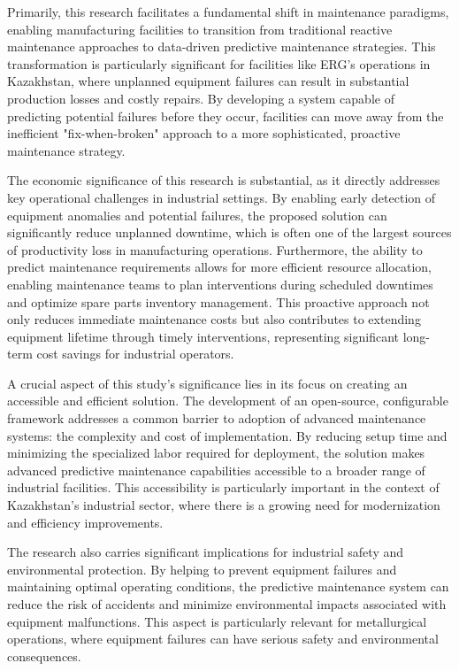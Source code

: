 Primarily, this research facilitates a fundamental shift in maintenance paradigms, enabling manufacturing facilities to transition from traditional reactive maintenance approaches to data-driven predictive maintenance strategies. This transformation is particularly significant for facilities like ERG's operations in Kazakhstan, where unplanned equipment failures can result in substantial production losses and costly repairs. By developing a system capable of predicting potential failures before they occur, facilities can move away from the inefficient "fix-when-broken" approach to a more sophisticated, proactive maintenance strategy.

The economic significance of this research is substantial, as it directly addresses key operational challenges in industrial settings. By enabling early detection of equipment anomalies and potential failures, the proposed solution can significantly reduce unplanned downtime, which is often one of the largest sources of productivity loss in manufacturing operations. Furthermore, the ability to predict maintenance requirements allows for more efficient resource allocation, enabling maintenance teams to plan interventions during scheduled downtimes and optimize spare parts inventory management. This proactive approach not only reduces immediate maintenance costs but also contributes to extending equipment lifetime through timely interventions, representing significant long-term cost savings for industrial operators.

A crucial aspect of this study's significance lies in its focus on creating an accessible and efficient solution. The development of an open-source, configurable framework addresses a common barrier to adoption of advanced maintenance systems: the complexity and cost of implementation. By reducing setup time and minimizing the specialized labor required for deployment, the solution makes advanced predictive maintenance capabilities accessible to a broader range of industrial facilities. This accessibility is particularly important in the context of Kazakhstan's industrial sector, where there is a growing need for modernization and efficiency improvements.

The research also carries significant implications for industrial safety and environmental protection. By helping to prevent equipment failures and maintaining optimal operating conditions, the predictive maintenance system can reduce the risk of accidents and minimize environmental impacts associated with equipment malfunctions. This aspect is particularly relevant for metallurgical operations, where equipment failures can have serious safety and environmental consequences.

